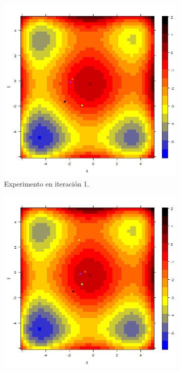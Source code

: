 \documentclass{article}
\begin{document}
\begin{figure}[H]
	\centering
	\begin{subfigure}[b]{0.45\linewidth}
		\includegraphics[width=\linewidth]{f1n001.png}
		\caption{Experimento en iteración 1.}
		\label{1}
	\end{subfigure}
	\begin{subfigure}[b]{0.45\linewidth}
		\includegraphics[width=\linewidth]{f1n020.png}

\end{subfigure}
\end{figure}
\end{document}
